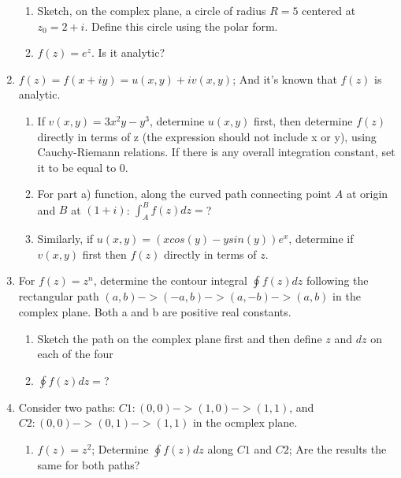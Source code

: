 \documentclass[12pt]{article}
\begin{document}
\begin{enumerate}
\begin{enumerate}
		\item Sketch, on the complex plane, a circle of radius $R=5$ centered at $z_{0} = 2 +i$. Define this circle using the polar form.


		\item $f(z) = e^{z}$. Is it analytic?

		\end{enumerate}



	\item $f(z)=f(x+iy)=u(x,y)+iv(x,y)$; And it's known that $f(z)$ is analytic.
		\begin{enumerate}

		    \item If $v(x,y) = 3x^{2} y-y^{3}$, determine $u(x,y)$ first, then determine $f(z)$ directly in terms of z (the expression should not include x or y), using Cauchy-Riemann relations. If there is any overall integration constant, set it to be equal to $0$.

		\item For part a) function, along the curved path connecting point $A$ at origin and $B$ at $(1+i)$: $\int_{A}^{B}f(z)dz=$?

		\item Similarly, if $u(x,y) = (xcos(y)-ysin(y))e^{x}$, determine if $v(x,y)$ first then $f(z)$ directly in terms of $z$.
		\end{enumerate}

	\item 
		For $f(z) = z^{n}$, determine the contour integral $\oint f(z)dz$ following the rectangular path $(a,b) -> (-a,b) -> (a,-b) -> (a,b) $ in the complex plane. Both a and b are positive real constants.
		\begin{enumerate}

		    \item Sketch the path on the complex plane first and then define $z$ and $dz$ on each of the four

		\item $\oint f(z)dz=$?

		\end{enumerate}
	
	\item
		Consider two paths: $C1:(0,0) -> (1,0) -> (1,1)$, and $C2: (0,0) -> (0,1) -> (1,1)$ in the ocmplex plane.
		\begin{enumerate}

		    \item 
			    $f(z)=z^{2}$; Determine $\oint f(z)dz$ along $C1$ and $C2$; Are the results the same for both paths?


\end{enumerate}
\end{enumerate}
\end{document}
